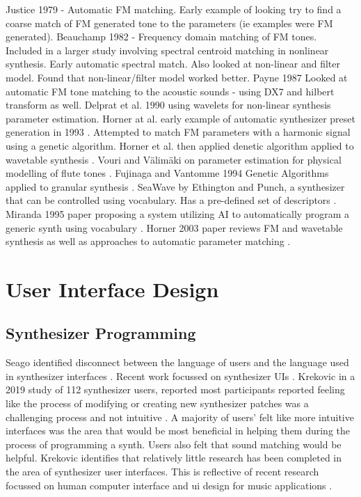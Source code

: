 Justice 1979 \cite{justice1979analytic}  - Automatic FM matching. Early example of looking try to find a coarse match of FM generated tone to the parameters (ie examples were FM generated). Beauchamp 1982 \cite{beauchamp1982synthesis} - Frequency domain matching of FM tones. Included in a larger study involving spectral centroid matching in nonlinear synthesis. Early automatic spectral match. Also looked at non-linear and filter model. Found that non-linear/filter model worked better. Payne 1987 \cite{payne1987microcomputer} Looked at automatic FM tone matching to the acoustic sounds - using DX7 and hilbert transform as well. Delprat et al. 1990 \cite{delprat1990parameter} using wavelets for non-linear synthesis parameter estimation. Horner at al. early example of automatic synthesizer preset generation in 1993 \cite{horner1993machine}. Attempted to match FM parameters with a harmonic signal using a genetic algorithm. Horner et al. then applied denetic algorithm applied to wavetable synthesis \cite{horner1993methods}. Vouri and V{\"a}lim{\"a}ki on parameter estimation for physical modelling of flute tones \cite{vuori1993parameter}. Fujinaga and Vantomme 1994 Genetic Algorithms applied to granular synthesis \cite{fujinaga1994genetic}. SeaWave by Ethington and Punch, a synthesizer that can be controlled using vocabulary. Has a pre-defined set of descriptors \cite{ethington1994seawave}. Miranda 1995 paper proposing a system utilizing AI to automatically program a generic synth using vocabulary \cite{miranda1995artificial}. Horner 2003 paper reviews FM and wavetable synthesis as well as approaches to automatic parameter matching \cite{horner2003auto}.


\section{User Interface Design}
\subsection{Synthesizer Programming}
Seago identified disconnect between the language of users and the language used in synthesizer interfaces \cite{seago2004critical}. Recent work focussed on synthesizer UIs \cite{rasmussen2018evaluating}. Krekovic in a 2019 study of 112 synthesizer users, reported most participants reported feeling like the process of modifying or creating new synthesizer patches was a challenging process and not intuitive \cite{krekovic2019insights}. A majority of users' felt like more intuitive interfaces was the area that would be most beneficial in helping them during the process of programming a synth. Users also felt that sound matching would be helpful. Krekovic identifies that relatively little research has been completed in the area of synthesizer user interfaces. This is reflective of recent research focussed on human computer interface and ui design for music applications \cite{pardo2019learning}\cite{knees2019intelligent}.